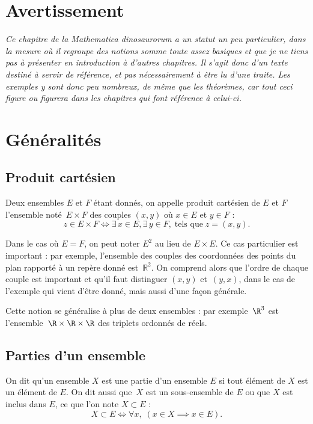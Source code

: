 
\tgoshorttoc
\section*{Avertissement}
{\itshape
Ce chapitre de la \emph{Mathematica dinosaurorum} a un statut un peu particulier, dans la mesure où il regroupe des notions somme toute assez basiques et que je ne tiens pas à présenter en introduction à d'autres chapitres. Il s'agit donc d'un texte destiné à servir de référence, et pas nécessairement à être lu d'une traite. Les exemples y sont donc peu nombreux, de même que les théorèmes, car tout ceci figure ou figurera dans les chapitres qui font référence à celui-ci.

}

\section{Généralités}
\subsection{Produit cartésien}
Deux ensembles $E$ et $F$ étant donnés, on appelle produit cartésien de $E$ et $F$ l'ensemble noté~$E\times F$ des couples $(x,y)$ où $x\in E$ et $y\in F$ :
\[z\in E\times F \iff \exists\, x \in E, \exists\, y\in F,\;\text{tels que}\; z=(x,y).\]

Dans le cas où $E=F$, on peut noter $E^2$ au lieu de $E\times E$. Ce cas particulier est important : par exemple, l'ensemble des couples des coordonnées des points du plan rapporté à un repère donné est~$\mathbb{R}^2$. On comprend alors que l'ordre de chaque couple est important et qu'il faut distinguer $(x,y)$ et~$(y,x)$, dans le cas de l'exemple qui vient d'être donné, mais aussi d'une façon générale.

Cette notion se généralise à plus de deux ensembles : par exemple~$\R^3$ est l'ensemble~\mbox{$\R\times\R\times\R$} des triplets ordonnés de réels.

\subsection{Parties d'un ensemble}
On dit qu'un ensemble $X$ est une partie d'un ensemble $E$ si tout élément de $X$ est un élément de $E$. On dit aussi que~$X$ est un sous-ensemble de $E$ ou que $X$ est inclus dans $E$, ce que l'on note $X \subset E$ :
\[X\subset E \iff \forall x,\; (x\in X\implies x\in E).\]

